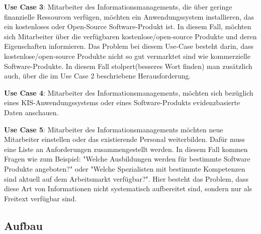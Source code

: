 \textbf{Use Case 3}: Mitarbeiter des Informationsmanagements, die über geringe finanzielle Ressourcen verfügen, möchten ein Anwendungssystem installieren, das ein kostenloses oder Open-Source Software-Produkt ist.
In diesem Fall, möchten sich Mitarbeiter über die verfügbaren kostenlose/open-source Produkte und deren Eigenschaften informieren.
Das Problem bei diesem Use-Case besteht darin, dass kostenlose/open-source Produkte nicht so gut vermarktet sind wie kommerzielle Software-Produkte. 
In diesem Fall stolpert(besseres Wort finden) man zusätzlich auch, über die im Use Case 2 beschriebene Herausforderung. \newline

\textbf{Use Case 4}: Mitarbeiter des Informationsmanagements, möchten sich bezüglich eines KIS-Anwendungssystems oder eines Software-Produkts evidenzbasierte Daten anschauen.  \newline

\textbf{Use Case 5}: Mitarbeiter des Informationsmanagements möchten neue Mitarbeiter einstellen oder das existierende Personal weiterbilden.
Dafür muss eine Liste an Anforderungen zusammengestellt werden.
In diesem Fall kommen Fragen wie zum Beispiel: "Welche Ausbildungen werden für bestimmte Software Produkte angeboten?" oder "Welche Spezialisten mit bestimmte Kompetenzen sind aktuell auf dem Arbeitsmarkt verfügbar?".
Hier besteht das Problem, dass diese Art von Informationen nicht systematisch aufbereitet sind, sondern nur als Freitext verfügbar sind.\newline


\subsection{Aufbau}


